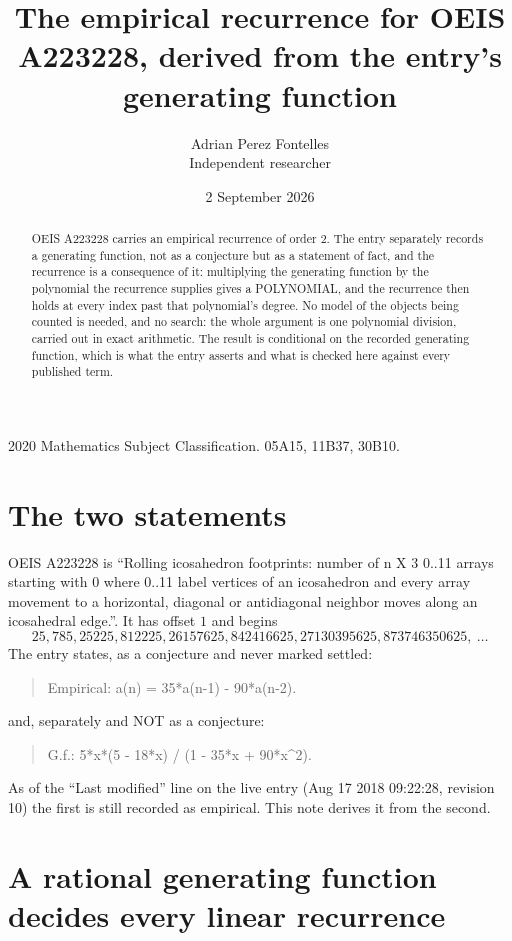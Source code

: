 \documentclass[11pt,a4paper]{article}
\title{The empirical recurrence for OEIS A223228, derived from the entry's generating function}
\author{Adrian Perez Fontelles\\ \small Independent researcher}
\date{2 September 2026}
\theoremstyle{plain}
\theoremstyle{definition}
\begin{document}
\maketitle

\begin{abstract}
OEIS A223228 carries an empirical recurrence of order $2$. The entry separately records a
generating function, not as a conjecture but as a statement of fact, and the recurrence is a
consequence of it: multiplying the generating function by the polynomial the recurrence
supplies gives a POLYNOMIAL, and the recurrence then holds at every index past that
polynomial's degree. No model of the objects being counted is needed, and no search: the
whole argument is one polynomial division, carried out in exact arithmetic. The result is
conditional on the recorded generating function, which is what the entry asserts and what is
checked here against every published term.
\end{abstract}

\noindent\small 2020 Mathematics Subject Classification. 05A15, 11B37, 30B10.\normalsize

\section{The two statements}

OEIS A223228 is ``Rolling icosahedron footprints: number of n X 3 0..11 arrays starting with 0 where 0..11 label vertices of an icosahedron and every array movement to a horizontal, diagonal or antidiagonal neighbor moves along an icosahedral edge.''. It has offset $1$ and begins
\[
25, 785, 25225, 812225, 26157625, 842416625, 27130395625, 873746350625,\ \dots
\]
The entry states, as a conjecture and never marked settled:
\begin{quote}
Empirical: a(n) = 35*a(n-1) - 90*a(n-2).
\end{quote}
and, separately and NOT as a conjecture:
\begin{quote}
G.f.: 5*x*(5 - 18*x) / (1 - 35*x + 90*x\^{}2).
\end{quote}
As of the ``Last modified'' line on the live entry (Aug 17 2018 09:22:28, revision 10) the first is still
recorded as empirical. This note derives it from the second.

\section{A rational generating function decides every linear recurrence}
\end{document}
